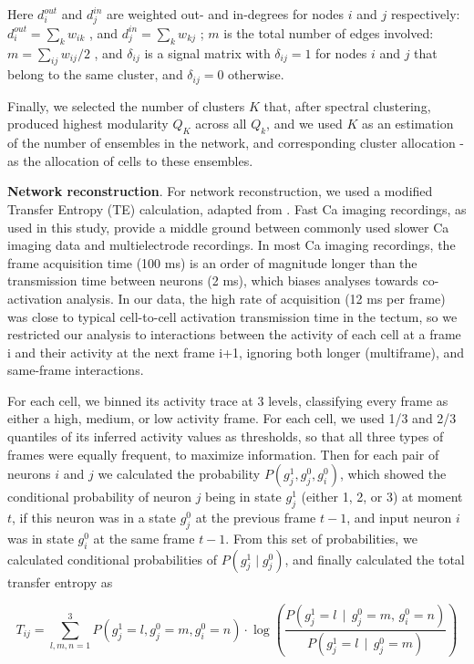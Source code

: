 \documentclass{article}
\begin{document}
Here $d^{out}_i$ and $d^{in}_j$ are weighted out- and in-degrees for nodes $i$ and $j$ respectively: $d^{out}_i = \sum_k{w_{ik}}$ , and $d^{in}_j = \sum_k{w_{kj}}$ ; $m$ is the total number of edges involved: $m = \sum_{ij}{w_{ij}}/2$ , and $\delta_{ij}$ is a signal matrix with $\delta_{ij}=1$ for nodes $i$ and $j$ that belong to the same cluster, and $\delta_{ij} = 0$ otherwise. 

Finally, we selected the number of clusters $K$ that, after spectral clustering, produced highest modularity $Q_K$ across all $Q_k$, and we used $K$ as an estimation of the number of ensembles in the network, and corresponding cluster allocation - as the allocation of cells to these ensembles.

\textbf{Network reconstruction}. For network reconstruction, we used a modified Transfer Entropy (TE) calculation, adapted from \citep{gourevitch2007te, stetter2012te}. Fast Ca imaging recordings, as used in this study, provide a middle ground between commonly used slower Ca imaging data and multielectrode recordings. In most Ca imaging recordings, the frame acquisition time (100 ms) is an order of magnitude longer than the transmission time between neurons (2 ms), which biases analyses towards co-activation analysis. In our data, the high rate of acquisition (12 ms per frame) was close to typical cell-to-cell activation transmission time in the tectum, so we restricted our analysis to interactions between the activity of each cell at a frame i and their activity at the next frame i+1, ignoring both longer (multiframe), and same-frame interactions.

For each cell, we binned its activity trace at 3 levels, classifying every frame as either a high, medium, or low activity frame. For each cell, we used 1/3 and 2/3 quantiles of its inferred activity values as thresholds, so that all three types of frames were equally frequent, to maximize information. Then for each pair of neurons $i$ and $j$ we calculated the probability $P(g_j^1,g_j^0,g_i^0)$, which showed the conditional probability of neuron $j$ being in state $g_j^1$ (either 1, 2, or 3) at moment $t$, if this neuron was in a state $g_j^0$ at the previous frame $t-1$, and  input neuron $i$ was in state $g_i^0$ at the same frame $t-1$. From this set of probabilities, we calculated conditional probabilities of $P(g_j^1 \mid g_j^0)$, and finally calculated the total transfer entropy as

\[ T_{ij} = \sum_{l,m,n=1}^3{P(g_j^1=l,g_j^0=m,g_i^0=n)}\cdot \log\left(\frac{P(g_j^1=l \, \mid \, g_j^0=m, \, g_i^0=n)}{P(g_j^1=l \, \mid \, g_j^0=m)}\right) \]
\end{document}
